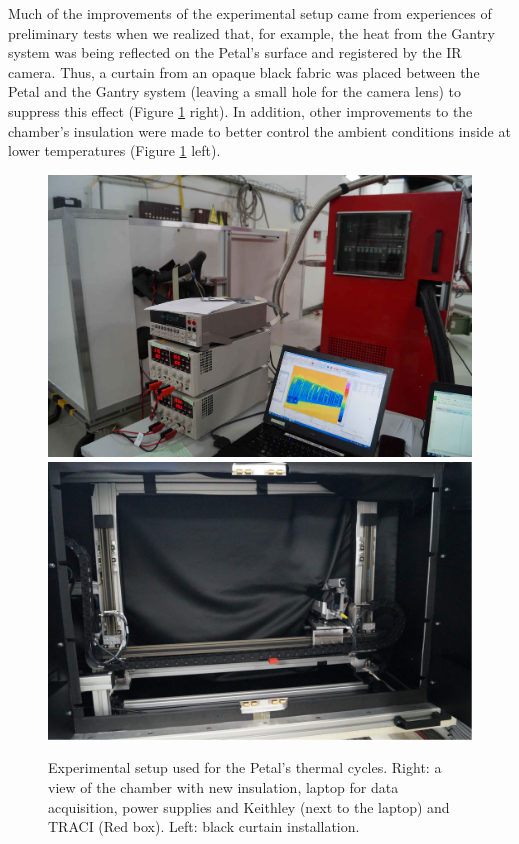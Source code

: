 		Much of the improvements of the experimental setup came from experiences of preliminary tests when we realized that, for example, the heat from the Gantry system was being reflected on the Petal’s surface and registered by the IR camera. Thus, a curtain from an opaque black fabric was placed between the Petal and the Gantry system (leaving a small hole for the camera lens) to suppress this effect (Figure \ref{fig2.7} right). In addition, other improvements to the chamber’s insulation were made to better control the ambient conditions inside at lower temperatures (Figure \ref{fig2.7} left). 
	
		\begin{figure}[ht!]
			\centering
			\captionsetup{justification=centering,margin=2cm}
			\includegraphics[scale=0.185]{Figures/Chapter02/ExperimentalSetup.jpg}
			\includegraphics[scale=0.22]{Figures/Chapter02/BlackCurtine.jpg}
			\caption{Experimental setup used for the Petal’s thermal cycles. Right: a view of the chamber with new insulation, laptop for data acquisition, power supplies and Keithley (next to the laptop) and TRACI (Red box). Left: black curtain installation.}\label{fig2.7}
		\end{figure}
	
